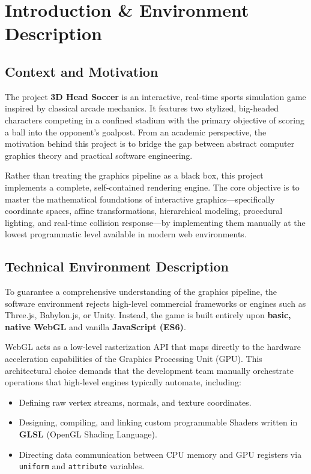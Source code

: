 \chapter{Introduction \& Environment Description}

\section{Context and Motivation}
The project \textbf{3D Head Soccer} is an interactive, real-time sports simulation game inspired by classical arcade mechanics. It features two stylized, big-headed characters competing in a confined stadium with the primary objective of scoring a ball into the opponent's goalpost. From an academic perspective, the motivation behind this project is to bridge the gap between abstract computer graphics theory and practical software engineering. 

Rather than treating the graphics pipeline as a black box, this project implements a complete, self-contained rendering engine. The core objective is to master the mathematical foundations of interactive graphics—specifically coordinate spaces, affine transformations, hierarchical modeling, procedural lighting, and real-time collision response—by implementing them manually at the lowest programmatic level available in modern web environments.

\section{Technical Environment Description}
To guarantee a comprehensive understanding of the graphics pipeline, the software environment rejects high-level commercial frameworks or engines such as Three.js, Babylon.js, or Unity. Instead, the game is built entirely upon \textbf{basic, native WebGL} and vanilla \textbf{JavaScript (ES6)}. 

WebGL acts as a low-level rasterization API that maps directly to the hardware acceleration capabilities of the Graphics Processing Unit (GPU). This architectural choice demands that the development team manually orchestrate operations that high-level engines typically automate, including:
\begin{itemize}
    \item Defining raw vertex streams, normals, and texture coordinates.
    \item Designing, compiling, and linking custom programmable Shaders written in \textbf{GLSL} (OpenGL Shading Language).
    \item Directing data communication between CPU memory and GPU registers via \texttt{uniform} and \texttt{attribute} variables.
\end{itemize}

